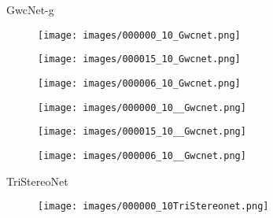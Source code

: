 \documentclass[10pt,twocolumn,letterpaper]{article}
\begin{document}
\begin{figure*}[htpb]
\begin{center}
\begin{minipage}[c]{0.985\textwidth}
		\end{minipage}
\begin{minipage}[c]{0.01\textwidth}
			\begin{turn}{90}\footnotesize{GwcNet-g \cite{guo2019group}}\end{turn}			
		\end{minipage}
		\begin{minipage}[c]{0.985\textwidth}
			\begin{subfigure}[c]{0.33\linewidth}
				\texttt{[image: images/000000\_10\_Gwcnet.png]}
			\end{subfigure}
			\hspace{-0.5\baselineskip}
			\hfill
			\begin{subfigure}[c]{0.33\linewidth}
				\texttt{[image: images/000015\_10\_Gwcnet.png]}
			\end{subfigure}
			\hspace{-0.5\baselineskip}
			\hfill
			\begin{subfigure}[c]{0.33\linewidth}
				\texttt{[image: images/000006\_10\_Gwcnet.png]}
			\end{subfigure}
			\begin{subfigure}[c]{0.33\linewidth}
				\texttt{[image: images/000000\_10\_\_Gwcnet.png]}
			\end{subfigure}
			\hspace{-0.5\baselineskip}
			\hfill
			\begin{subfigure}[c]{0.33\linewidth}
				\texttt{[image: images/000015\_10\_\_Gwcnet.png]}
			\end{subfigure}
			\hspace{-0.5\baselineskip}
			\hfill
			\begin{subfigure}[c]{0.33\linewidth}
				\texttt{[image: images/000006\_10\_\_Gwcnet.png]}
			\end{subfigure}
		\end{minipage}
\begin{minipage}[c]{0.01\textwidth}
			\begin{turn}{90}\footnotesize{TriStereoNet}\end{turn}			
		\end{minipage}
		\begin{minipage}[c]{0.985\textwidth}
			\begin{subfigure}[c]{0.33\linewidth}
				\texttt{[image: images/000000\_10TriStereonet.png]}
			\end{subfigure}

\end{minipage}
\end{center}
\end{figure*}
\end{document}
